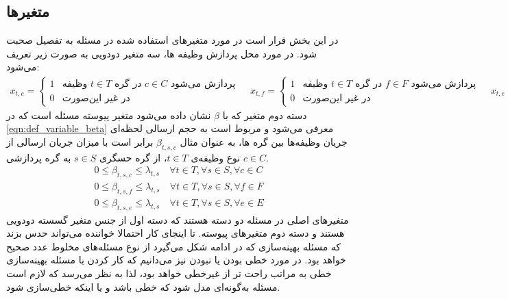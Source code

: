 	\subsection{متغیرها}
	در این بخش قرار است در مورد متغیرهای استفاده شده در مسئله به تفصیل صحبت شود. 
	در مورد محل پردازش وظیفه ها، سه متغیر دودویی به صورت زیر تعریف می‌شود:
	    \begin{subequations}\label{eqn:def_variable_x}
		\begin{align}
			x_{t,c} =
			\begin{cases}
				1 & \text{وظیفه $t \in T$ در گره $c \in C$ پردازش می‌شود } \\
				0 & \text{در غیر این‌صورت}
			\end{cases}
		\end{align}
		\begin{align}
			x_{t,f} =
			\begin{cases}
				1 & \text{وظیفه $t \in T$ در گره $f \in F$ پردازش می‌شود } \\
				0 & \text{در غیر این‌صورت}
			\end{cases}
		\end{align}
		\begin{align}
			x_{t,e} =
			\begin{cases}
				1 & \text{وظیفه $t \in T$ در گره $e \in E$ پردازش می‌شود } \\
				0 & \text{در غیر این‌صورت}
			\end{cases}
		\end{align}
	\end{subequations}
	دسته دوم متغیر که با $\beta$ نشان داده می‌شود متغیر پیوسته مسئله است که در \cref{eqn:def_variable_beta} معرفی می‌شود و مربوط است به حجم ارسالی لحظه‌ای جریان وظیفه‌ها بین گره ها، به عنوان مثال $\beta_{t,s,c}$ برابر است با میزان جریان ارسالی از نوع وظیفه‌ی $t \in T$، از گره حسگری $s \in S$ به گره پردازشی $c \in C$.
	\begin{subequations}\label{eqn:def_variable_beta}
		\begin{align}
		0 \le \beta_{t,s,c} \le \lambda_{t,s}  \quad \forall{t \in T}, \forall{s \in S}, \forall{c \in C} \\
		0 \le \beta_{t,s,f} \le \lambda_{t,s}  \quad \forall{t \in T}, \forall{s \in S}, \forall{f \in F} \\
		0 \le \beta_{t,s,e} \le \lambda_{t,s}  \quad \forall{t \in T}, \forall{s \in S}, \forall{e \in E}
		\end{align}
	\end{subequations}
	متغیرهای اصلی در مسئله دو دسته هستند که دسته اول از جنس متغیر گسسته دودویی هستند و دسته دوم متغیرهای پیوسته. تا اینجای کار احتمالا خواننده می‌تواند حدس بزند که مسئله بهینه‌سازی که در ادامه شکل می‌گیرد از نوع مسئله‌های مخلوط عدد صحیح  خواهد بود. در مورد خطی بودن یا نبودن نیز می‌دانیم که کار کردن با مسئله بهینه‌سازی خطی به مراتب راحت تر از غیرخطی خواهد بود، لذا به نظر می‌رسد که لازم است مسئله به‌گونه‌ای مدل شود که خطی باشد و یا اینکه خطی‌سازی شود. 
	
